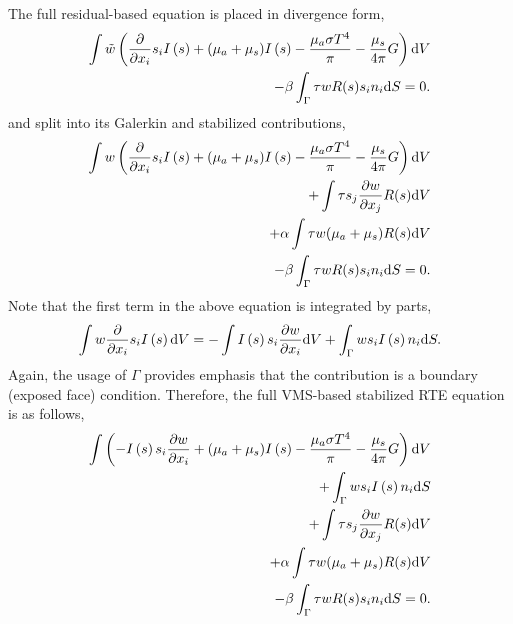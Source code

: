 The full residual-based equation is placed in divergence form,
\begin{eqnarray}
   \int \tilde w \left( {{\partial} \over {\partial x_i}} s_i I\left(s\right)
   + (\mu_a + \mu_s) I\left(s\right) - {{\mu_a \sigma T^4} \over {\pi}} -\frac{\mu_s}{4\pi}G \right) {\rm d}V \nonumber \\
   - \beta \int_\Gamma \tau w R(s) s_i n_i {\rm d}S = 0.
\label{rteDivForm}
\end{eqnarray}
and split into its Galerkin and stabilized contributions,
\begin{eqnarray}
   \int w \left( {{\partial} \over {\partial x_i}} s_i I\left(s\right)
   + (\mu_a + \mu_s )I\left(s\right) - {{\mu_a \sigma T^4} \over {\pi}} -\frac{\mu_s}{4\pi}G \right) {\rm d}V \nonumber \\
 +\int \tau s_j \frac{\partial w }{\partial x_j} R(s) {\rm d}V \nonumber \\
+\alpha\int \tau w (\mu_a + \mu_s)R(s) {\rm d}V \nonumber \\
- \beta \int_\Gamma \tau w R(s) s_i n_i {\rm d}S = 0.
\label{rteDivFormSub}
\end{eqnarray}
Note that the first term in the above equation is integrated by parts,
\begin{equation}
\int w {{\partial} \over {\partial x_i}} s_i I\left(s\right) {\rm d}V = -\int I\left(s\right) s_i \frac{\partial w}{\partial x_i} {\rm d}V 
+ \int_{\Gamma} w s_i I\left(s\right) n_i {\rm d}S.
\end{equation}
Again, the usage of $\Gamma$ provides emphasis that the contribution is a boundary (exposed face) condition. 
Therefore, the full VMS-based stabilized RTE equation is as follows,
\begin{eqnarray}
   \int \left( -I\left(s\right) s_i \frac{\partial w}{\partial x_i} + (\mu_a + \mu_s) I\left(s\right) 
- {{\mu_a \sigma T^4} \over {\pi}} -\frac{\mu_s}{4\pi}G \right) {\rm d}V  \nonumber \\
+ \int_\Gamma w s_i I\left(s\right) n_i {\rm d}S \nonumber \\
 +\int \tau s_j \frac{\partial w }{\partial x_j} R(s) {\rm d}V \nonumber \\
+\alpha\int \tau w (\mu_a + \mu_s)R(s) {\rm d}V \nonumber \\
- \beta \int_\Gamma \tau w R(s) s_i n_i {\rm d}S = 0.
\label{rteDivFormSub}
\end{eqnarray}

